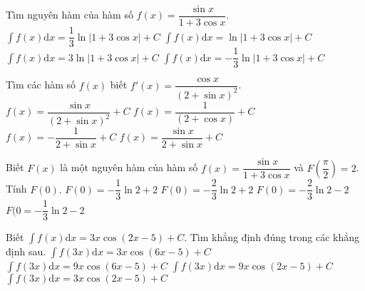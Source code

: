 \begin{ex}
	Tìm nguyên hàm của hàm số $ f(x)=\dfrac{\sin x}{1+3\cos x}$.
	\choice
	{$\displaystyle\int{f(x)}\mathrm{d}x=\dfrac{1}{3}\ln\left| 1+3\cos x\right|+C$}
	{$\displaystyle\int{f(x)}\mathrm{d}x=\ln\left| 1+3\cos x\right|+C$}
	{$\displaystyle\int{f(x)}\mathrm{d}x=3\ln\left| 1+3\cos x\right|+C$}
	{\True $\displaystyle\int{f(x)}\mathrm{d}x=-\dfrac{1}{3}\ln\left| 1+3\cos x\right|+C$}
\end{ex}
\begin{ex}
	Tìm các hàm số $ f(x)$ biết $f'(x)=\dfrac{\cos x}{(2+\sin x)^2}$.
	\choice
	{$ f(x)=\dfrac{\sin x}{(2+\sin x)^2}+C$}
	{$ f(x)=\dfrac{1}{(2+\cos x)}+C$}
	{\True $ f(x)=-\dfrac{1}{2+\sin x}+C$}
	{$ f(x)=\dfrac{\sin x}{2+\sin x}+C$}
\end{ex}
\begin{ex}
	Biết $F(x)$ là một nguyên hàm của hàm số $ f(x)=\dfrac{\sin x}{1+3\cos x}$ và $F\left(\dfrac{\pi}{2}\right)=2$. Tính $F(0).$ 
	\choice
	{$ F(0)=-\dfrac{1}{3}\ln 2+2$}
	{\True $ F(0)=-\dfrac{2}{3}\ln 2+2$}
	{$ F(0)=-\dfrac{2}{3}\ln 2-2$}
	{$ F(0=-\dfrac{1}{3}\ln 2-2$}
\end{ex}
\begin{ex}
	Biết $\displaystyle\int{f(x)\mathrm{d}x=3x\cos\left(2x-5\right)+C}$. Tìm khẳng định đúng trong các khẳng định sau.
	\choice
	{\True $\displaystyle\int{f\left(3x\right)\mathrm{d}x=3x\cos\left(6x-5\right)+C}$}
	{$\displaystyle\int{f\left(3x\right)\mathrm{d}x=9x\cos\left(6x-5\right)+C}$}
	{$\displaystyle\int{f\left(3x\right)\mathrm{d}x=9x\cos\left(2x-5\right)+C}$}
	{$\displaystyle\int{f\left(3x\right)\mathrm{d}x=3x\cos\left(2x-5\right)+C}$}
\end{ex}
